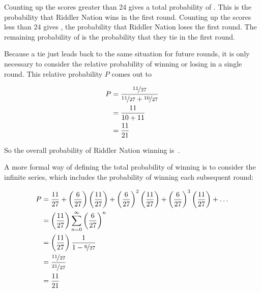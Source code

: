 \documentclass{article}
\begin{document}
Counting up the scores greater than 24 gives a total probability of .
This is the probability that Riddler Nation wins in the first round.
Counting up the scores less than 24 gives , the probability that Riddler Nation loses the first round.
The remaining probability of  is the probability that they tie in the first round.

Because a tie just leads back to the same situation for future rounds, it is only necessary to consider the relative probability of winning or losing in a single round.
This relative probability $P$ comes out to

\begin{align*}
P&=\frac{\nicefrac{11}{27}}{\nicefrac{11}{27}+\nicefrac{10}{27}} \\
 &=\frac{11}{10+11} \\
 &=\frac{11}{21}
\end{align*}

So the overall probability of Riddler Nation winning is
\,.

A more formal way of defining the total probability of winning is to consider the infinite series, which includes the probability of winning each subsequent round:

\begin{align*}
P&=\frac{11}{27}+\left(\frac{6}{27}\right)\left(\frac{11}{27}\right)+\left(\frac{6}{27}\right)^{2}\left(\frac{11}{27}\right)+\left(\frac{6}{27}\right)^{3}\left(\frac{11}{27}\right)+\dots \\
 &=\left(\frac{11}{27}\right)\sum_{n=0}^{\infty}\left(\frac{6}{27}\right)^{n} \\
 &=\left(\frac{11}{27}\right)\frac{1}{1-\nicefrac{6}{27}} \\
 &=\frac{\nicefrac{11}{27}}{\nicefrac{21}{27}} \\
 &=\frac{11}{21}
\end{align*}
\end{document}
